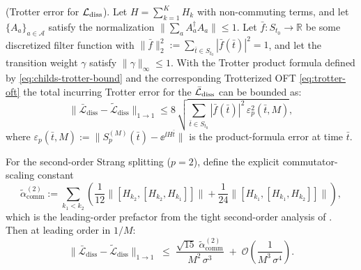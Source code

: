 \begin{proposition} \label{prop:trotter-diss}
    \textup{(Trotter error for $\mathcal{L}_\textup{diss}$).} Let $H = \sum_{k=1}^K H_k$ with non-commuting terms, and let $\{A_a\}_{a \in \mathcal{A}}$ satisfy the normalization $\|\sum_a A_a^\dagger A_a\| \leq 1$. Let $\bar{f} : S_{t_0} \to \mathbb{R}$ be some discretized filter function with $\|\bar{f}\|_2^2 := \sum_{\bar{t} \in S_{t_0}} |\bar{f}(\bar{t})|^2 = 1$, and let the transition weight $\gamma$ satisfy $\|\gamma\|_\infty \leq 1$. With the Trotter product formula defined by \eqref{eq:childs-trotter-bound} and the corresponding Trotterized OFT \eqref{eq:trotter-oft} the total incurring Trotter error for the $\mathcal{\bar{L}}_\textup{diss}$ can be bounded as:
    $$
    \bigl\|\bar{\mathcal{L}}_{\mathrm{diss}} - \tilde{\mathcal{L}}_{\mathrm{diss}}\bigr\|_{1 \to 1}
    \leq 8\,\sqrt{\sum_{\bar{t} \in S_{t_0}} |\bar{f}(\bar{t})|^2\, \varepsilon_p^2(\bar{t}, M)},
    $$
    where $\varepsilon_p(\bar{t}, M) := \|S_p^{(M)}(\bar{t}) - \ee^{\ii H\bar{t}}\|$ is the product-formula error at time $\bar{t}$.

    For the second-order Strang splitting ($p = 2$), define the explicit commutator-scaling constant
    $$
    \tilde{\alpha}_{\mathrm{comm}}^{(2)}
    := \sum_{k_1 < k_2}
    \left(
      \frac{1}{12}\bigl\|[H_{k_2},[H_{k_2},H_{k_1}]]\bigr\|
    + \frac{1}{24}\bigl\|[H_{k_1},[H_{k_1},H_{k_2}]]\bigr\|
    \right),
    $$
    which is the leading-order prefactor from the tight second-order analysis of \cite[Proposition 10]{childs2021theory}. Then at leading order in $1 / M$:
    $$
    \bigl\|\bar{\mathcal{L}}_{\mathrm{diss}}
          - \tilde{\mathcal{L}}_{\mathrm{diss}}\bigr\|_{1 \to 1}
    \;\leq\;
    \frac{\sqrt{15}\;\tilde{\alpha}_{\mathrm{comm}}^{(2)}}
         {M^2\,\sigma^3}
    \;+\; \mathcal{O}\!\left(\frac{1}{M^3\,\sigma^4}\right).
    $$
\end{proposition}
